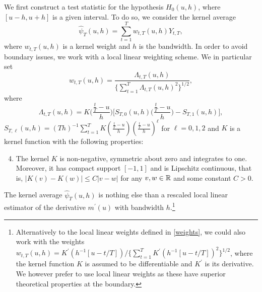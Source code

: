 We first construct a test statistic for the hypothesis $H_0(u,h)$, where $[u-h,u+h]$ is a given interval. To do so, we consider the kernel average
\begin{equation*}
\widehat{\psi}_T(u,h) = \sum\limits_{t=1}^T w_{t,T}(u,h) Y_{t,T}, 
\end{equation*}
where $w_{t,T}(u,h)$ is a kernel weight and $h$ is the bandwidth. In order to avoid boundary issues, we work with a local linear weighting scheme. We in particular set 
\begin{equation}\label{weights}
w_{t,T}(u,h) = \frac{\Lambda_{t,T}(u,h)}{ \{\sum\nolimits_{t=1}^T \Lambda_{t,T}(u,h)^2 \}^{1/2} }, 
\end{equation}
where
\[ \Lambda_{t,T}(u,h) = K\Big(\frac{\frac{t}{T}-u}{h}\Big) \Big[ S_{T,0}(u,h) \Big(\frac{\frac{t}{T}-u}{h}\Big) - S_{T,1}(u,h) \Big], \]
$S_{T,\ell}(u,h) = (Th)^{-1} \sum\nolimits_{t=1}^T K(\frac{\frac{t}{T}-u}{h}) (\frac{\frac{t}{T}-u}{h})^\ell$ for $\ell = 0,1,2$ and $K$ is a kernel function with the following properties: 
\begin{enumerate}[label=(C\arabic*),leftmargin=1.05cm]
\setcounter{enumi}{3}
\item \label{C-ker} The kernel $K$ is non-negative, symmetric about zero and integrates to one. Moreover, it has compact support $[-1,1]$ and is Lipschitz continuous, that is, $|K(v) - K(w)| \le C |v-w|$ for any $v,w \in \mathbb{R}$ and some constant $C > 0$. 
\end{enumerate} 
The kernel average $\widehat{\psi}_T(u,h)$ is nothing else than a rescaled local linear estimator of the derivative $m^\prime(u)$ with bandwidth $h$.\footnote{Alternatively to the local linear weights defined in \eqref{weights}, we could also work with the weights $w_{t,T}(u,h) = K^\prime( h^{-1} [u - t/T] )/ \{ \sum\nolimits_{t=1}^T  K^\prime( h^{-1}[u - t/T] )^2 \}^{1/2}$, where the kernel function $K$ is assumed to be differentiable and $K^\prime$ is its derivative. We however prefer to use local linear weights as these have superior theoretical properties at the boundary.}  


